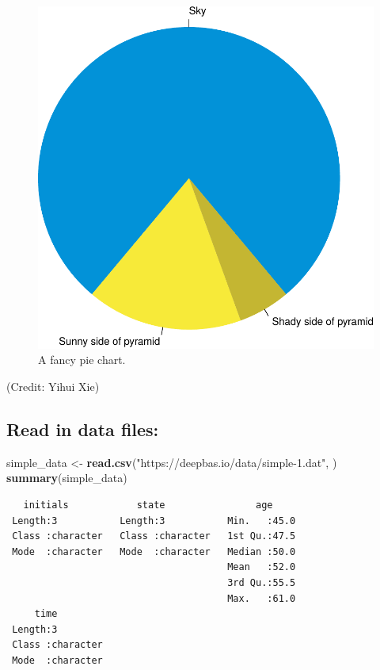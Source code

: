 \documentclass[
]{book}
\newenvironment{Shaded}{\begin{snugshade}}{\end{snugshade}}
\newcommand{\FunctionTok}[1]{\textcolor[rgb]{0.13,0.29,0.53}{\textbf{#1}}}
\newcommand{\NormalTok}[1]{#1}
\newcommand{\OtherTok}[1]{\textcolor[rgb]{0.56,0.35,0.01}{#1}}
\newcommand{\StringTok}[1]{\textcolor[rgb]{0.31,0.60,0.02}{#1}}
\begin{document}
\begin{figure}
\includegraphics[width=1\linewidth]{rmarkdown_files/figure-latex/pie-1} \caption{A fancy pie chart.}\label{fig:pie}
\end{figure}

(Credit: Yihui Xie)

\hypertarget{read-in-data-files}{%
\subsection{Read in data files:}\label{read-in-data-files}}

\begin{Shaded}
\begin{Highlighting}[]
\NormalTok{simple\_data }\OtherTok{\textless{}{-}} \FunctionTok{read.csv}\NormalTok{(}\StringTok{"https://deepbas.io/data/simple{-}1.dat"}\NormalTok{, )}
\FunctionTok{summary}\NormalTok{(simple\_data) }
\end{Highlighting}
\end{Shaded}

\begin{verbatim}
   initials            state                age      
 Length:3           Length:3           Min.   :45.0  
 Class :character   Class :character   1st Qu.:47.5  
 Mode  :character   Mode  :character   Median :50.0  
                                       Mean   :52.0  
                                       3rd Qu.:55.5  
                                       Max.   :61.0  
     time          
 Length:3          
 Class :character  
 Mode  :character  
                   
                   
                   
\end{verbatim}
\end{document}
